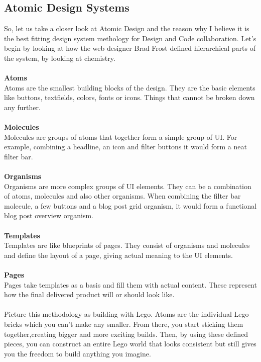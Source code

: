 \newpage
\subsection{Atomic Design Systems} %
So, let us take a closer look at Atomic Design and the reason why I believe it is the best fitting
design system methology for Design and Code collaboration. Let's begin by looking at how the web
designer Brad Frost defined hierarchical parts of the system, by looking at chemistry. \\\\
\textbf{Atoms} \\
Atoms are the smallest building blocks of the design. They are the basic elements like buttons,
textfields, colors, fonts or icons. Things that cannot be broken down any further. \\\\
\textbf{Molecules} \\
Molecules are groups of atoms that together form a simple group of UI. For example, combining
a headline, an icon and filter buttons it would form a neat filter bar. \\\\
\textbf{Organisms} \\
Organisms are more complex groups of UI elements. They can be a combination of atoms, molecules and
also other organisms. When combining the filter bar molecule, a few buttons and a blog post grid
organism, it would form a functional blog post overview organism. \\\\
\textbf{Templates} \\
Templates are like blueprints of pages. They consist of organisms and molecules and define the
layout of a page, giving actual meaning to the UI elements. \\\\
\textbf{Pages}\\
Pages take templates as a basis and fill them with actual content. These represent how the final
delivered product will or should look like. \\
\\

Picture this methodology as building with Lego. Atoms are the individual Lego bricks
which you can't make any smaller. From there, you start sticking them together,creating bigger and
more exciting builds. Then, by using these defined pieces, you can construct an entire Lego world
that looks consistent but still gives you the freedom to build anything you imagine.

